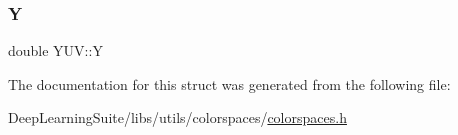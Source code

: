 \mbox{\label{struct_y_u_v_a4d1d3671a68d8b66418f0eb4a73d8a8a}} 
\subsubsection{\texorpdfstring{Y}{Y}}
{\footnotesize\ttfamily double Y\+U\+V\+::Y}



The documentation for this struct was generated from the following file\+:\begin{DoxyCompactItemize}
\item 
Deep\+Learning\+Suite/libs/utils/colorspaces/\hyperlink{colorspaces_8h}{colorspaces.\+h}\end{DoxyCompactItemize}
